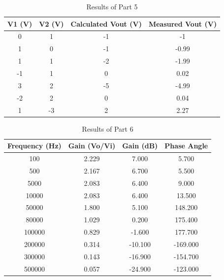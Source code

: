 \documentclass[CMPE]{KGCOEReport}
\begin{document}
\begin{table}[H]
    \centering
    \caption{Results of Part 5}
    \begin{tabular}{|c|c|c|c|}
        \hline
        V1 (V) & V2 (V) & Calculated Vout (V) & Measured Vout (V) \\
        \hline
        0 & 1 & -1 & -1 \\
        1 & 0 & -1 & -0.99 \\
        1 & 1 & -2 & -1.99 \\
        -1 & 1 & 0 & 0.02 \\
        3 & 2 & -5 & -4.99 \\
        -2 & 2 & 0 & 0.04 \\
        1 & -3 & 2 & 2.27 \\
        \hline
    \end{tabular}
\end{table}


\begin{table}[H]
    \centering
    \caption{Results of Part 6}
    \begin{tabular}{|c|c|c|c|}
        \hline
        Frequency (Hz) & Gain (Vo/Vi) & Gain (dB) & Phase Angle \\
        \hline
        100 & 2.229 & 7.000 & 5.700 \\
        500 & 2.167 & 6.700 & 5.500 \\
        5000 & 2.083 & 6.400 & 9.000 \\
        10000 & 2.083 & 6.400 & 13.500 \\
        50000 & 1.800 & 5.100 & 148.200 \\
        80000 & 1.029 & 0.200 & 175.400 \\
        100000 & 0.829 & -1.600 & 177.700 \\
        200000 & 0.314 & -10.100 & -169.000 \\
        300000 & 0.143 & -16.900 & -154.700 \\
        500000 & 0.057 & -24.900 & -123.000 \\
        \hline
    \end{tabular}
\end{table}
\end{document}
